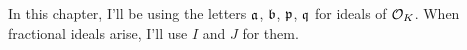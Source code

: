
\begin{remark}
	In this chapter, I'll be using the letters $\aa$, $\bb$, $\pp$, $\qq$
	for ideals of $\OO_K$.
	When fractional ideals arise, I'll use $I$ and $J$ for them.
\end{remark}

